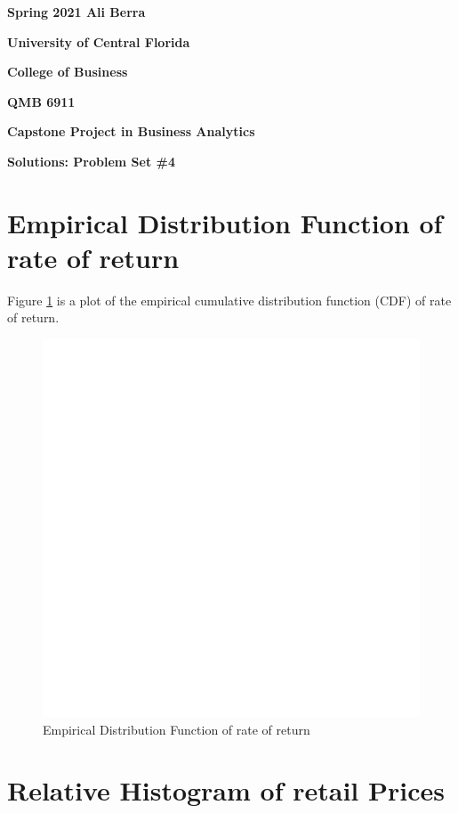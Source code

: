 \documentclass[11pt]{book}
\begin{document}

\pagestyle{empty}
{\noindent\bf Spring 2021 \hfill Ali Berra}
\vskip 16pt
\centerline{\bf University of Central Florida}
\centerline{\bf College of Business}
\vskip 16pt
\centerline{\bf QMB 6911}
\centerline{\bf Capstone Project in Business Analytics}
\vskip 10pt
\centerline{\bf Solutions:  Problem Set \#4}
\vskip 32pt
\noindent



\section*{Empirical Distribution Function of rate of return}

Figure \ref{fig:ecdf_prices} is 
a plot of the empirical cumulative distribution function (CDF) of rate of return. 


\begin{figure}[h!]
  \centering
  \includegraphics[scale = 0.5, keepaspectratio=true]{../Figures/ecdf_prices}
  \caption{Empirical Distribution Function of rate of return} \label{fig:ecdf_prices}
\end{figure}


\section*{Relative Histogram of retail Prices}
\end{document}
